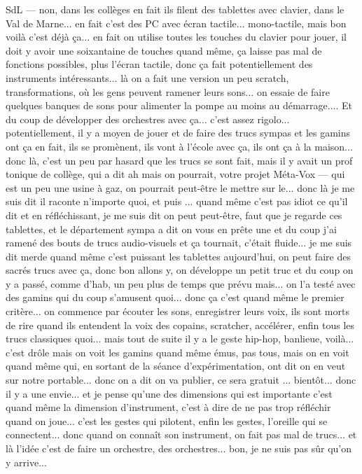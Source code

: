 SdL — non, dans les collèges en fait ils filent des tablettes avec clavier, dans le Val de Marne... en fait c'est des PC avec écran tactile... mono-tactile, mais bon voilà c'est déjà ça... en fait on utilise toutes les touches du clavier pour jouer, il doit y avoir une soixantaine de touches quand même, ça laisse pas mal de fonctions possibles, plus l'écran tactile, donc ça fait potentiellement des instruments intéressants... là on a fait une version un peu scratch, transformations, où les gens peuvent ramener leurs sons... on essaie de faire quelques banques de sons pour alimenter la pompe au moins au démarrage.... Et du coup de développer des orchestres avec ça... c'est assez rigolo... potentiellement, il y a moyen de jouer et de faire des trucs sympas et les gamins ont ça en fait, ils se promènent, ils vont à l'école avec ça, ils ont ça à la maison... donc là, c'est un peu par hasard que les trucs se sont fait, mais il y avait un prof tonique de collège, qui a dit ah mais on pourrait, votre projet Méta-Vox — qui est un peu une usine à gaz, on pourrait peut-être le mettre sur le... donc là je me suis dit il raconte n'importe quoi, et puis ... quand même c'est pas idiot ce qu'il dit et en réfléchissant, je me suis dit on peut peut-être, faut que je regarde ces tablettes, et le département sympa a dit on vous en prête une et du coup j'ai ramené des bouts de trucs audio-visuels et ça tournait, c'était fluide... je me suis dit merde quand même c'est puissant les tablettes aujourd'hui, on peut faire des sacrés trucs avec ça, donc bon allons y, on développe un petit truc et du coup on y a passé, comme d'hab, un peu plus de temps que prévu mais... on l'a testé avec des gamins qui du coup s'amusent quoi... donc ça c'est quand même le premier critère... on commence par écouter les sons, enregistrer leurs voix, ils sont morts de rire quand ils entendent la voix des copains, scratcher, accélérer, enfin tous les trucs classiques quoi... mais tout de suite il y a le geste hip-hop, banlieue, voilà... c'est drôle mais on voit les gamins quand même émus, pas tous, mais on en voit quand même qui, en sortant de la séance d'expérimentation, ont dit on en veut sur notre portable... donc on a dit on va publier, ce sera gratuit ... bientôt... donc il y a une envie... et je pense qu'une des dimensions qui est importante c'est quand même la dimension d'instrument, c'est à dire de ne pas trop réfléchir quand on joue... c'est les gestes qui pilotent, enfin les gestes, l'oreille qui se connectent... donc quand on connaît son instrument, on fait pas mal de trucs... et là l'idée c'est de faire un orchestre, des orchestres... bon, je ne suis pas sûr qu'on y arrive... 

